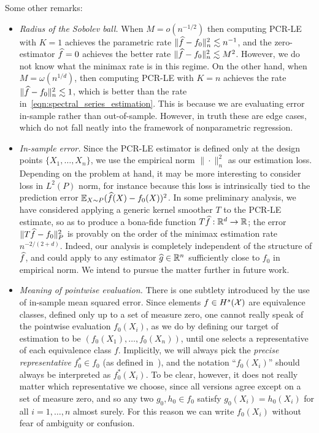 Some other remarks:
\begin{itemize}
	\item \emph{Radius of the Sobolev ball.} 
	When $M = o(n^{-1/2})$ then computing PCR-LE with $K = 1$ achieves the parametric rate $\|\widehat{f} - f_0\|_n^2 \lesssim n^{-1}$, and the zero-estimator $\widehat{f} = 0$ achieves the better rate $\|\widehat{f} - f_0\|_n^2 \lesssim M^2$. However, we do not know what the minimax rate is in this regime. On the other hand, when $M = \omega(n^{1/d})$, then computing PCR-LE with $K = n$ achieves the rate $\|\widehat{f} - f_0\|_n^2 \lesssim 1$, which is better than the rate in~\eqref{eqn:spectral_series_estimation}. This is because we are evaluating error in-sample rather than out-of-sample. However, in truth these are edge cases, which do not fall neatly into the framework of nonparametric regression. 
	
	\item \emph{In-sample error.} Since the PCR-LE estimator is defined only at the design points $\{X_1,\ldots,X_n\}$, we use the empirical norm $\|\cdot\|_n^2$ as our estimation loss. Depending on the problem at hand, it may be more interesting to consider loss in $L^2(P)$ norm, for instance because this loss is intrinsically tied to the prediction error $\mathbb{E}_{X \sim P}(\widehat{f}(X) - f_0(X))^2$. In some preliminary analysis, we have considered applying a generic kernel smoother $T$ to the PCR-LE estimate, so as to produce a bona-fide function $T\widehat{f}: \mathbb{R}^d \to \mathbb{R}$; the error $\|T\widehat{f} - f_0\|_P^2$ is provably on the order of the minimax estimation rate $n^{-2/(2 + d)}$. Indeed, our analysis is completely independent of the structure of $\widehat{f}$, and could apply to any estimator $\widehat{g} \in \mathbb{R}^n$ sufficiently close to $f_0$ in empirical norm. We intend to pursue the matter further in future work.
	
	\item \emph{Meaning of pointwise evaluation.} There is one subtlety introduced by the use of in-sample mean squared error. Since elements $f \in H^s(\mathcal{X})$ are equivalence classes, defined only up to a set of measure zero, one cannot really speak of the pointwise evaluation $f_0(X_i)$, as we do by defining our target of estimation to be $(f_0(X_1),\ldots,f_0(X_n))$, until one selects a representative of each equivalence class $f$. Implicitly, we will always pick the \emph{precise representative} $f_0^{\ast} \in f_0$ (as defined in~\cite{evans15}), and the notation ``$f_0(X_i)$'' should always be interpreted as $f_0^{\ast}(X_i)$. To be clear, however, it does not really matter which representative we choose, since all versions agree except on a set of measure zero, and so any two $g_0,h_0 \in f_0$ satisfy $g_0(X_i) = h_0(X_i)$ for all $i = 1,\ldots,n$ almost surely. For this reason we can write $f_0(X_i)$ without fear of ambiguity or confusion. 
	

\end{itemize}
